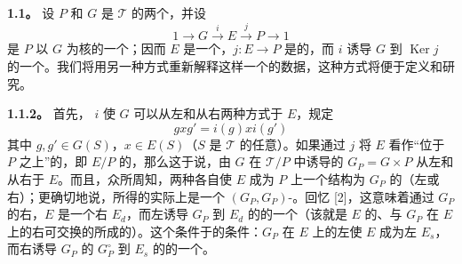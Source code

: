 \textbf{1.1。} 设 $P$ 和 $G$ 是 $\mathcal T$ 的两个，并设
\[
1\longrightarrow G\xrightarrow{i}E\xrightarrow{j}P\longrightarrow1
\tag{1.1.1}
\]
是 $P$ 以 $G$ 为核的一个；因而 $E$ 是一个，$j:E\to P$ 是的，而 $i$ 诱导 $G$ 到 $\operatorname{Ker}j$ 的一个。我们将用另一种方式重新解释这样一个的数据，这种方式将便于定义和研究。

\textbf{1.1.2。} 首先， $i$ 使 $G$ 可以从左和从右两种方式于 $E$，规定
\[
gxg'=i(g)xi(g')
\]
其中 $g,g'\in G(S)$，$x\in E(S)$（$S$ 是 $\mathcal T$ 的任意）。如果通过 $j$ 将 $E$ 看作“位于 $P$ 之上”的，即 $E/P$ 的，那么这于说，由 $G$ 在 $\mathcal T/P$ 中诱导的 $G_P=G\times P$ 从左和从右于 $E$。而且，众所周知，两种各自使 $E$ 成为 $P$ 上一个结构为 $G_P$ 的（左或右）；更确切地说，所得的实际上是一个 $(G_P,G_P)$-。回忆 [2]，这意味着通过 $G_P$ 的右，$E$ 是一个右 $E_d$，而左诱导 $G_P$ 到 $E_d$ 的的一个（该就是 $E$ 的、与 $G_P$ 在 $E$ 上的右可交换的所成的）。这个条件于的条件：$G_P$ 在 $E$ 上的左使 $E$ 成为左 $E_s$，而右诱导 $G_P$ 的 $G_P^\circ$ 到 $E_s$ 的的一个。

